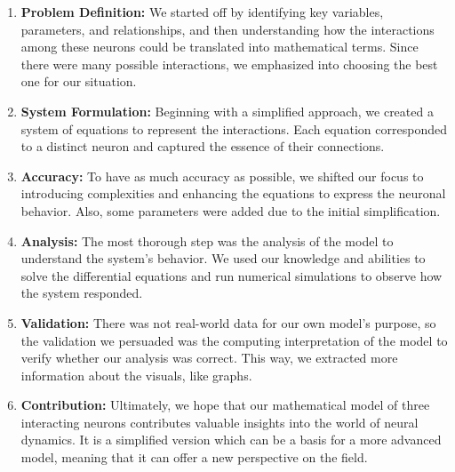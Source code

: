 \documentclass[class={myRUCProject}, crop=false]{standalone}
\begin{document}
\begin{enumerate}
    \item \textbf{Problem Definition:} We started off by identifying key variables, parameters, and relationships, and then understanding how the interactions among these neurons could be translated into mathematical terms. Since there were many possible interactions, we emphasized into choosing the best one for our situation. 
    \item \textbf{System Formulation:} Beginning with a simplified approach, we created a system of equations to represent the interactions. Each equation corresponded to a distinct neuron and captured the essence of their connections.
    \item \textbf{Accuracy:} To have as much accuracy as possible, we shifted our focus to introducing complexities and enhancing the equations to express the neuronal behavior. Also, some parameters were added due to the initial simplification.
    \item \textbf{Analysis:} The most thorough step was the analysis of the model to understand the system's behavior. We used our knowledge and abilities to solve the differential equations and run numerical simulations to observe how the system responded.
    \item \textbf{Validation:} There was not real-world data for our own model's purpose, so the validation we persuaded was the computing interpretation of the model to verify whether our analysis was correct. This way, we extracted more information about the visuals, like graphs.
    \item \textbf{Contribution:} Ultimately, we hope that our mathematical model of three interacting neurons contributes valuable insights into the world of neural dynamics. It is a simplified version which can be a basis for a more advanced model, meaning that it can offer a new perspective on the field.

\end{enumerate}
\end{document}
